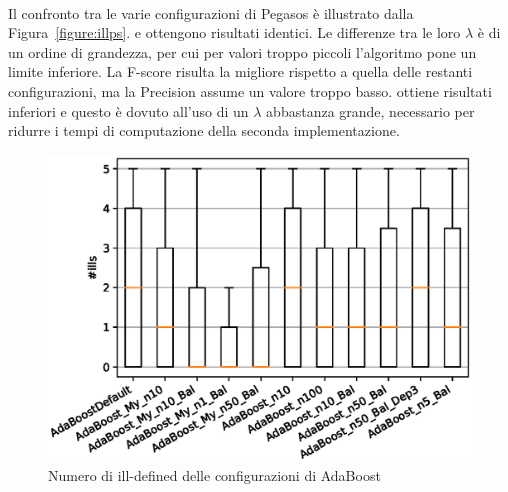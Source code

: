 \documentclass[12pt,a4paper,oneside,hidelinks]{report}
\begin{document}
\paragraph*{}
Il confronto tra le varie configurazioni di Pegasos è illustrato dalla Figura~\ref{figure:illps}.  e  ottengono risultati identici. Le differenze tra le loro $\lambda$ è di un ordine di grandezza, per cui per valori troppo piccoli l'algoritmo pone un limite inferiore. La F-score risulta la migliore rispetto a quella delle restanti configurazioni, ma la Precision assume un valore troppo basso.  ottiene risultati inferiori e questo è dovuto all'uso di un $\lambda$ abbastanza grande, necessario per ridurre i tempi di computazione della seconda implementazione.  


\vspace*{\fill}

\begin{figure}[p]%
    \centering
    \includegraphics[scale = 0.80]{CC-AdaBoost-ills.eps}%
    \caption{Numero di ill-defined delle configurazioni di AdaBoost}%
    \label{figure:ill1}%
\end{figure}
\end{document}
